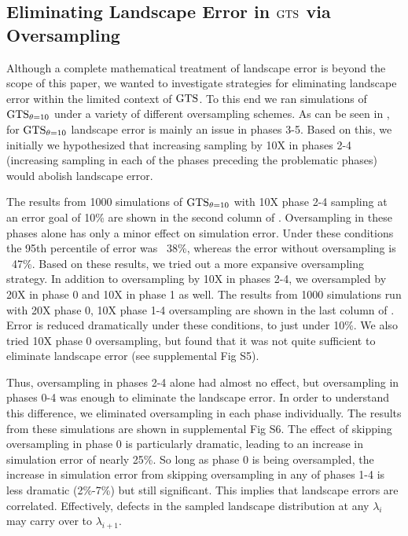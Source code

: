 \subsection{Eliminating Landscape Error in $\text{GTS}$ via Oversampling}
\label{sec:oversampling}

Although a complete mathematical treatment of landscape error is beyond the scope of this paper, we wanted to investigate strategies for eliminating landscape error within the limited context of $\text{GTS}$. To this end we ran  simulations of $\text{GTS}_{\theta=10}$ under a variety of different oversampling schemes. As can be seen in , for $\text{GTS}_{\theta=10}$ landscape error is mainly an issue in phases 3-5. Based on this, we initially we hypothesized that increasing sampling by 10X in phases 2-4 (\ie increasing sampling in each of the phases preceding the problematic phases) would abolish landscape error.

The results from 1000 simulations of $\text{GTS}_{\theta=10}$ with 10X phase 2-4 sampling at an error goal of 10\% are shown in the second column of . Oversampling in these phases alone has only a minor effect on simulation error. Under these conditions the 95th percentile of error was ~38\%, whereas the error without oversampling is ~47\%. Based on these results, we tried out a more expansive oversampling strategy. In addition to oversampling by 10X in phases 2-4, we oversampled by 20X in phase 0 and 10X in phase 1 as well. The results from 1000 simulations run with 20X phase 0, 10X phase 1-4 oversampling are shown in the last column of . Error is reduced dramatically under these conditions, to just under 10\%. We also tried 10X phase 0 oversampling, but found that it was not quite sufficient to eliminate landscape error (see supplemental Fig S5).

Thus, oversampling in phases 2-4 alone had almost no effect, but oversampling in phases 0-4 was enough to eliminate the landscape error. In order to understand this difference, we eliminated oversampling in each phase individually. The results from these simulations are shown in supplemental Fig S6. The effect of skipping oversampling in phase 0 is particularly dramatic, leading to an increase in simulation error of nearly 25\%. So long as phase 0 is being oversampled, the increase in simulation error from skipping oversampling in any of phases 1-4 is less dramatic (2\%-7\%) but still significant. This implies that landscape errors are correlated. Effectively, defects in the sampled landscape distribution at any $\lambda_i$ may carry over to $\lambda_{i+1}$.

